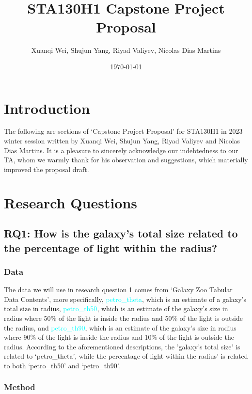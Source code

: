 \documentclass[12pt]{article}
\title{STA130H1 Capstone Project Proposal}
\author{Xuanqi Wei, Shujun Yang, Riyad Valiyev, Nicolas Dias Martins}
\date{\today}
\begin{document}
\maketitle
\thispagestyle{empty}


\tableofcontents
\thispagestyle{empty}

\setcounter{page}{0}

\section{Introduction}

The following are sections of `Capstone Project Proposal' for STA130H1 in 2023 winter session written by Xuanqi Wei, Shujun Yang, Riyad Valiyev and Nicolas Dias Martins. It is a pleasure to sincerely acknowledge our indebtedness to our TA, whom we warmly thank for his observation and suggestions, which materially improved the proposal draft. 

\section{Research Questions}

\subsection{RQ1: How is the galaxy's total size related to the percentage of light within the radius?}

\subsubsection{Data}

The data we will use in research question 1 comes from `Galaxy Zoo Tabular Data Contents', more specifically, \textcolor{cyan}{petro\_theta}, which is an estimate of a galaxy's total size in radius, \textcolor{cyan}{petro\_th50}, which is an estimate of the galaxy's size in radius where 50\% of the light is inside the radius and 50\% of the light is outside the radius, and \textcolor{cyan}{petro\_th90}, which is an estimate of the galaxy's size in radius where 90\% of the light is inside the radius and 10\% of the light is outside the radius. According to the aforementioned descriptions, the 'galaxy's total size' is related to `petro\_theta', while the percentage of light within the radius' is related to both `petro\_th50' and `petro\_th90'. 

\subsubsection{Method}
\end{document}
